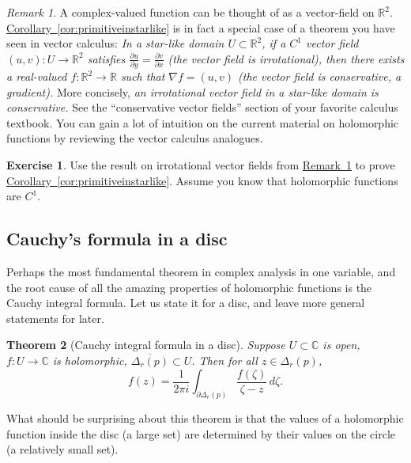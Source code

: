 \documentclass[12pt,openany]{book}
\newcommand{\C}{{\mathbb{C}}}
\newcommand{\R}{{\mathbb{R}}}
\newcommand{\myquote}[1]{``#1''}
\theoremstyle{plain}
\newtheorem{thm}{Theorem}[section]
\theoremstyle{remark}
\newtheorem{remark}[thm]{Remark}
\theoremstyle{definition}
\newenvironment{exbox}{%
    \def\FrameCommand{\vrule width 1pt \relax\hspace{10pt}}%
    \MakeFramed{\advance\hsize-\width\FrameRestore}%
}{%
    \endMakeFramed
}
\theoremstyle{exercise}
\newtheorem{exercise}{Exercise}[section]
\theoremstyle{example}
\newcommand{\corref}[1]{\hyperref[#1]{Corollary~\ref*{#1}}}
\newcommand{\remarkref}[1]{\hyperref[#1]{Remark~\ref*{#1}}}
\begin{document}
\begin{remark}\label{remark:irrotvfield}
A complex-valued function can be thought of as a vector-field on $\R^2$.
\corref{cor:primitiveinstarlike}
is in fact a special case of a theorem you have seen
in vector calculus:  \emph{In a star-like domain $U \subset \R^2$, if a
$C^1$ vector field $(u,v) \colon U \to \R^2$
satisfies $\frac{\partial u}{\partial y} = \frac{\partial v}{\partial x}$
(the vector field is \emph{irrotational}),
then there exists a real-valued $f \colon \R^2 \to \R$ such that
$\nabla f = (u,v)$ (the vector field is conservative, a gradient).}
More concisely, \emph{an irrotational vector field
in a star-like domain is conservative.}
See the \myquote{conservative vector fields} section
of your favorite calculus textbook.  You can gain a lot of
intuition on the current material on holomorphic functions by reviewing the
vector calculus analogues.
\end{remark}

\begin{exbox}
\begin{exercise}
Use the result on irrotational vector fields from
\remarkref{remark:irrotvfield} to prove 
\corref{cor:primitiveinstarlike}.
Assume you know that holomorphic functions are $C^1$.
\end{exercise}
\end{exbox}

\subsection{Cauchy's formula in a disc}

Perhaps the most fundamental theorem in complex analysis in one variable,
and the root cause of all the amazing properties of holomorphic functions
is the Cauchy integral formula.  Let us state it for a disc, and leave
more general statements for later.

\begin{thm}[Cauchy integral formula in a disc]
Suppose $U \subset \C$ is open, $f \colon U \to \C$ is holomorphic,
$\overline{\Delta_r(p)} \subset U$.
Then for all $z \in \Delta_r(p)$,
\begin{equation*}
f(z)
=
\frac{1}{2\pi i}
\int_{\partial \Delta_r(p)}
\frac{f(\zeta)}{\zeta-z}
\,
d \zeta .
\end{equation*}
\end{thm}

What should be surprising about this theorem is that the values of a
holomorphic function inside the disc (a large set) are determined by their
values on the circle (a relatively small set).
\end{document}
